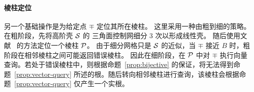 \paragraph{棱柱定位}
另一个基础操作是为给定点 $\mp$ 定位其所在棱柱。
这里采用一种由粗到细的策略。
在粗阶段，先将高阶壳 $\mathcal{S}$ 的 \Bezier 三角面控制网细分 3 次以形成线性壳。
随后使用文献~\cite{Jiang2020BijectivePI} 的方法定位一个棱柱 $\mathcal{P}$。
%
由于细分网格只是 $\mathcal{S}$ 的近似，当 $\mp$ 接近 $B$ 时，粗阶段在相邻棱柱之间可能返回错误棱柱。
因此在细阶段，在 $\mathcal{P}$ 中对 $\mp$ 执行向量查询。若处于错误棱柱中，则根据命题~\ref{prop:bijective} 的保证，将无法得到命题~\ref{prop:vector-query} 所述的根。随后转向相邻棱柱进行查询，该棱柱会根据命题~\ref{prop:vector-query} 仅产生一个实根。

%
%
%
%


